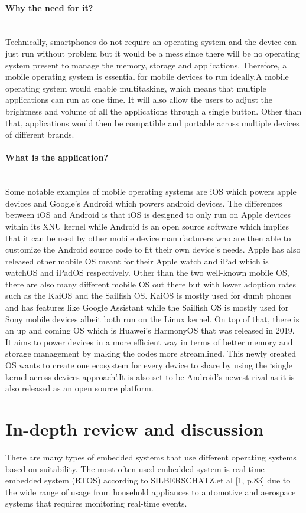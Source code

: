 \documentclass[conference]{IEEEtran}
\begin{document}
\paragraph{Why the need for it?}\mbox{} \\
Technically, smartphones do not require an operating system and the device can just run without problem but it would be a mess since there will be no operating system present to manage the memory, storage and applications. Therefore, a mobile operating system is essential for mobile devices to run ideally.A mobile operating system would enable multitasking, which means that multiple applications can run at one time. It will also allow the users to adjust the brightness and volume of all the applications through a single button. Other than that, applications would then be compatible and portable across multiple devices of different brands.
\\
\paragraph{What is the application?}\mbox{} \\
Some notable examples of mobile operating systems are iOS which powers apple devices and Google’s Android which powers android devices. The differences between iOS and Android is that iOS is designed to only run on Apple devices within its XNU kernel while Android is an open source software which implies that it can be used by other mobile device manufacturers who are then able to customize the Android source code to fit their own device’s needs. Apple has also released other mobile OS meant for their Apple watch and iPad which is watchOS and iPadOS respectively. Other than the two well-known mobile OS, there are also many different mobile OS out there but with lower adoption rates such as the KaiOS and the Sailfish OS. KaiOS is mostly used for dumb phones and has features like Google Assistant while the Sailfish OS is mostly used for Sony mobile devices albeit both run on the Linux kernel. On top of that, there is an up and coming OS which is Huawei’s HarmonyOS that was released in 2019. It aims to power devices in a more efficient way in terms of better memory and storage management by making the codes more streamlined. This newly created OS wants to create one ecosystem for every device to share by using the ‘single kernel across devices approach’.It is also set to be Android’s newest rival as it is also released as an open source platform.

\section{In-depth review and discussion}
There are many types of embedded systems that use different operating systems based on suitability. The most often used embedded system is real-time embedded system (RTOS) according to SILBERSCHATZ.et al [1, p.83] due to the wide range of usage from household appliances to automotive and aerospace systems that requires monitoring real-time events.
\end{document}
